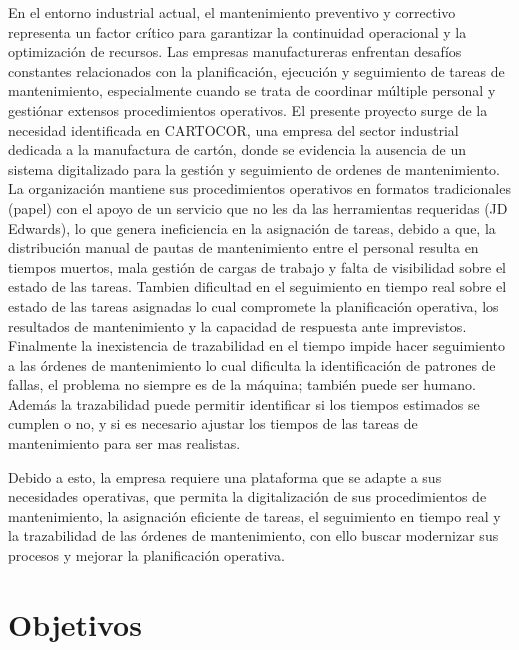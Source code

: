 \documentclass[12pt,a4paper]{report}
\begin{document}
En el entorno industrial actual, el mantenimiento preventivo y correctivo representa un factor crítico para garantizar la continuidad operacional y la optimización de recursos. Las empresas manufactureras enfrentan desafíos constantes relacionados con la planificación, ejecución y seguimiento de tareas de mantenimiento, especialmente cuando se trata de coordinar múltiple personal y gestiónar extensos procedimientos operativos.
El presente proyecto surge de la necesidad identificada en CARTOCOR, una empresa del sector industrial dedicada a la manufactura de cartón, donde se evidencia la ausencia de un sistema digitalizado para la gestión y seguimiento de ordenes de mantenimiento. La organización mantiene sus procedimientos operativos en formatos tradicionales (papel) con el apoyo de un servicio que no les da las herramientas requeridas (JD Edwards), lo que genera ineficiencia en la asignación de tareas, debido a que, la distribución manual de pautas de mantenimiento entre el personal resulta en tiempos muertos, mala gestión de cargas de trabajo y falta de visibilidad sobre el estado de las tareas. Tambien dificultad en el seguimiento en tiempo real sobre el estado de las tareas asignadas lo cual compromete la planificación operativa, los resultados de mantenimiento y la capacidad de respuesta ante imprevistos. Finalmente la inexistencia de trazabilidad en el tiempo impide hacer seguimiento a las órdenes de mantenimiento lo cual dificulta la identificación de patrones de fallas, el problema no siempre es de la máquina; también puede ser humano. Además la trazabilidad puede permitir identificar si los tiempos estimados se cumplen o no, y si es necesario ajustar los tiempos de las tareas de mantenimiento para ser mas realistas.

Debido a esto, la empresa requiere una plataforma que se adapte a sus necesidades operativas, que permita la digitalización de sus procedimientos de mantenimiento, la asignación eficiente de tareas, el seguimiento en tiempo real y la trazabilidad de las órdenes de mantenimiento, con ello buscar modernizar sus procesos y mejorar la planificación operativa.


\chapter*{Objetivos}
\end{document}
